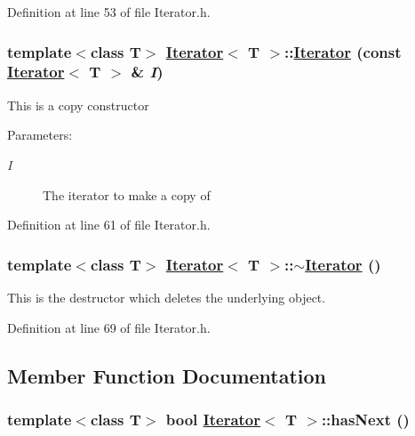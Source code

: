 Definition at line 53 of file Iterator.h.\hypertarget{classIterator_a1}{
\subsubsection[Iterator]{\setlength{\rightskip}{0pt plus 5cm}template$<$class T$>$ \hyperlink{classIterator}{Iterator}$<$ T $>$::\hyperlink{classIterator}{Iterator} (const \hyperlink{classIterator}{Iterator}$<$ T $>$ \& {\em I})}}
\label{classIterator_a1}


This is a copy constructor \begin{Desc}
\item[Parameters:]
\begin{description}
\item[{\em I}]The iterator to make a copy of \end{description}
\end{Desc}


Definition at line 61 of file Iterator.h.\hypertarget{classIterator_a2}{
\subsubsection[$\sim$Iterator]{\setlength{\rightskip}{0pt plus 5cm}template$<$class T$>$ \hyperlink{classIterator}{Iterator}$<$ T $>$::$\sim$\hyperlink{classIterator}{Iterator} ()}}
\label{classIterator_a2}


This is the destructor which deletes the underlying object. 

Definition at line 69 of file Iterator.h.

\subsection{Member Function Documentation}
\hypertarget{classIterator_a4}{
\subsubsection[hasNext]{\setlength{\rightskip}{0pt plus 5cm}template$<$class T$>$ bool \hyperlink{classIterator}{Iterator}$<$ T $>$::has\-Next ()}}
\label{classIterator_a4}



